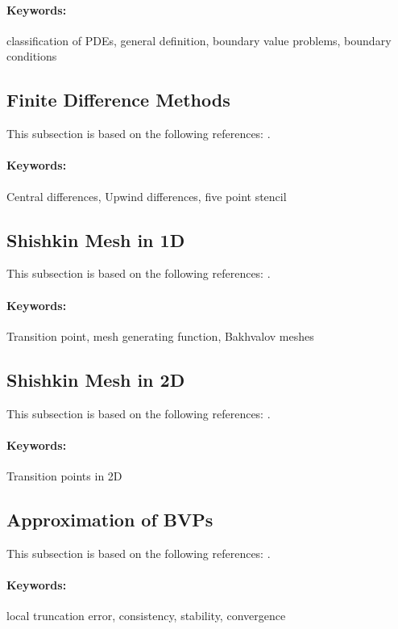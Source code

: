 \paragraph{Keywords:} classification of PDEs, general definition, boundary value problems, boundary conditions


\subsection{Finite Difference Methods}
This subsection is based on the following references: \cite{LanRosSzy91, Saa03, Smi85, Var09}.
\paragraph{Keywords:} Central differences, Upwind differences, five point stencil


\newpage
\subsection{Shishkin Mesh in 1D}
This subsection is based on the following references: \cite{FraLiuRooStyZho09, Lin10}.\\
\paragraph{Keywords:} Transition point, mesh generating function, Bakhvalov meshes


\subsection{Shishkin Mesh in 2D}
This subsection is based on the following references: \cite{FraLiuRooStyZho09, Lin10}.
\paragraph{Keywords:} Transition points in 2D


\subsection{Approximation of BVPs}
\label{back:convdiff:BVPapprox}
This subsection is based on the following references: \cite{GriDolSil15, Smi85}.
\paragraph{Keywords:} local truncation error, consistency, stability, convergence


